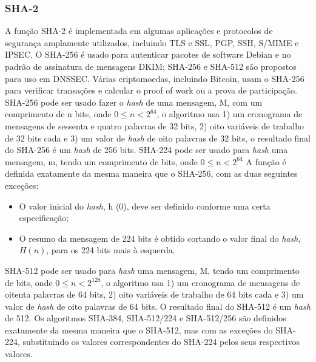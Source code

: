 \documentclass[conference]{IEEEtran}
\begin{document}
\subsubsection{SHA-2}

A função SHA-2 é implementada em algumas aplicações e protocolos de segurança amplamente utilizados, 
incluindo TLS e SSL, PGP, SSH, S/MIME e IPSEC.
O SHA-256 é usado para autenticar pacotes de software Debian e no padrão de assinatura de 
mensagens DKIM; SHA-256 e SHA-512 são propostos para uso em DNSSEC. \cite{rfc5702}
Várias criptomoedas, incluindo Bitcoin, usam o SHA-256 para verificar transações e calcular o proof of work ou a 
prova de participação. \cite{sha256Bitcoin}
SHA-256 pode ser usado fazer o \textit{hash} de uma mensagem, M, com um comprimento de n bits, onde $0 \leq n < 2^{64}$, 
o algoritmo usa 1) um cronograma de mensagens de sessenta e quatro palavras de 32 bits, 
2) oito variáveis de trabalho de 32 bits cada e 3) um valor de \textit{hash} de oito palavras de 32 bits, 
o resultado final do SHA-256 é um \textit{hash} de 256 bits.
SHA-224 pode ser usado para \textit{hash} uma mensagem, m, tendo um comprimento de bits, onde $0 \leq n < 2^{64}$
A função é definida exatamente da mesma maneira que o SHA-256, com as duas seguintes exceções:
\begin{itemize}
\item O valor inicial do \textit{hash}, h (0), deve ser definido conforme uma certa especificação;
\item O resumo da mensagem de 224 bits é obtido cortando o valor final do \textit{hash}, $H(n)$, para os 224 
bits mais à esquerda.
\end{itemize}
SHA-512 pode ser usado para \textit{hash} uma mensagem, M, tendo um comprimento de bits, onde $0 \leq n < 2^{128}$, 
o algoritmo usa 1) um cronograma de mensagens de oitenta palavras de 64 bits, 2) oito variáveis 
de trabalho de 64 bits cada e 3) um valor de \textit{hash} de oito palavras de 64 bits. 
O resultado final do SHA-512 é um \textit{hash} de 512.
Os algoritmos SHA-384, SHA-512/224 e SHA-512/256 são definidos exatamente da mesma maneira que o SHA-512, 
mas com as exceções do SHA-224, substituindo os valores correspondentes do SHA-224 pelos seus respectivos valores. \cite{SHS2015}
\end{document}
